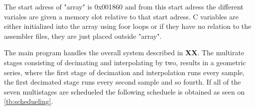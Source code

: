 The start adress of "array" is 0x001860 and from this start adress the different variales are given a memory slot relative to that start adress. C variables are either initialized into the array using foor loops or if they have no relation to the assembler files, they are just placed outside "array".

The main program handles the overall system described in \textbf{XX}. The multirate stages consisting of decimating and interpolating by two, results in a geometric series, where the first stage of decimation and interpolation runs every sample, the first decimated stage runs every second sample and so fourth. If all of the seven multistages are schedueled the following scheduele is obtained as seen on \autoref{tb:schedueling}.    



